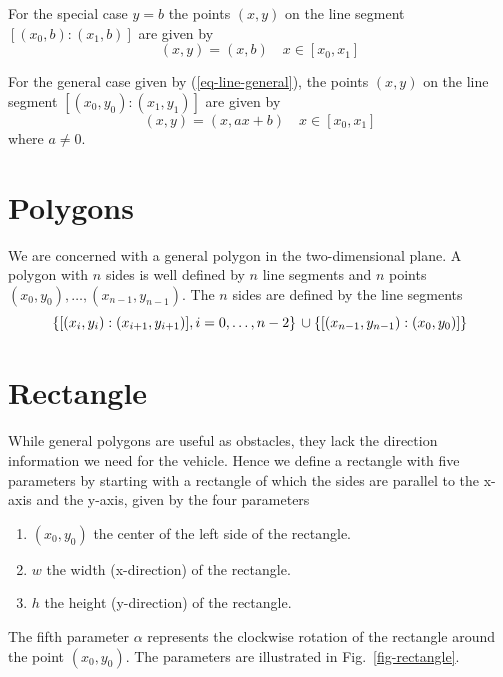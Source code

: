 \documentclass[11pt]{article}
\newcommand{\eqn}[1]{(\ref{#1})}
\newcommand{\figref}[1]{Fig.~\eqref{#1}}
\begin{document}
For the special case $y = b$ the points $(x, y)$ on the line segment
$[(x_0, b):(x_1, b)]$ are given by
\begin{equation}
    (x, y) = (x, b)\quad x\in [x_0, x_1]\label{eq-seg-yb}
\end{equation}

For the general case given by \eqn{eq-line-general}, the points $(x, y)$ on
the line segment $[(x_0, y_0):(x_1, y_1)]$ are given by
\begin{equation}
    (x, y) = (x, ax + b)\quad x\in [x_0, x_1]\label{eq-seg-general}
\end{equation}
where $a\neq 0$.

\section{Polygons}
\label{sec-polygons}

We are concerned with a general polygon in the two-dimensional plane. A polygon
with $n$ sides is well defined by $n$ line segments and $n$ points $(x_0,
y_0),\ldots,(x_{n-1}, y_{n-1})$. The $n$ sides are defined by the line segments
\begin{equation}
    \left\{[(x_i, y_i):(x_{i+1}, y_{i+1})], i=0,\ldots,n-2\right\}\\
\cup\left\{[(x_{n-1}, y_{n-1}):(x_{0}, y_{0})]\right\}
\end{equation}

\section{Rectangle}
\label{sec-rectangle}
While general polygons are useful as obstacles, they lack the direction
information we need for the vehicle.  Hence we define a rectangle with five
parameters by starting with a rectangle of which the sides are parallel to
the x-axis and the y-axis, given by the four parameters
\begin{enumerate}
    \item $(x_0, y_0)$ the center of the left side of the rectangle.
    \item $w$ the width (x-direction) of the rectangle.
    \item $h$ the height (y-direction) of the rectangle.
\end{enumerate}
The fifth parameter $\alpha$ represents the clockwise rotation of the
rectangle around the point $\left(x_0, y_0\right)$. The parameters are
illustrated in \figref{fig-rectangle}.
\end{document}
